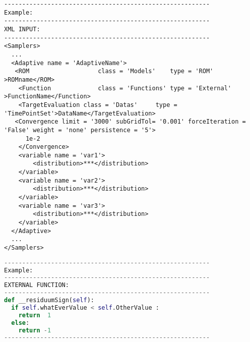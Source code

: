 \begin{lstlisting}[style=XML]
---------------------------------------------------------
Example:
---------------------------------------------------------
XML INPUT:
--------------------------------------------------------- 
<Samplers>
  ...
  <Adaptive name = 'AdaptiveName'>
   <ROM                   class = 'Models'    type = 'ROM'            >ROMname</ROM>
    <Function             class = 'Functions' type = 'External'      >FunctionName</Function>
    <TargetEvaluation class = 'Datas'     type = 'TimePointSet'>DataName</TargetEvaluation>
   <Convergence limit = '3000' subGridTol= '0.001' forceIteration = 'False' weight = 'none' persistence = '5'>
      1e-2
    </Convergence>
    <variable name = 'var1'>
        <distribution>***</distribution>
    </variable>
    <variable name = 'var2'>
        <distribution>***</distribution>
    </variable>
    <variable name = 'var3'>
        <distribution>***</distribution>
    </variable>
  </Adaptive>
  ...
</Samplers>
\end{lstlisting} 
\begin{lstlisting}[language=python]
---------------------------------------------------------
Example:
---------------------------------------------------------
EXTERNAL FUNCTION:
---------------------------------------------------------
def __residuumSign(self):
  if self.whatEverValue < self.OtherValue : 
    return  1
  else: 
    return -1
---------------------------------------------------------
\end{lstlisting} 


